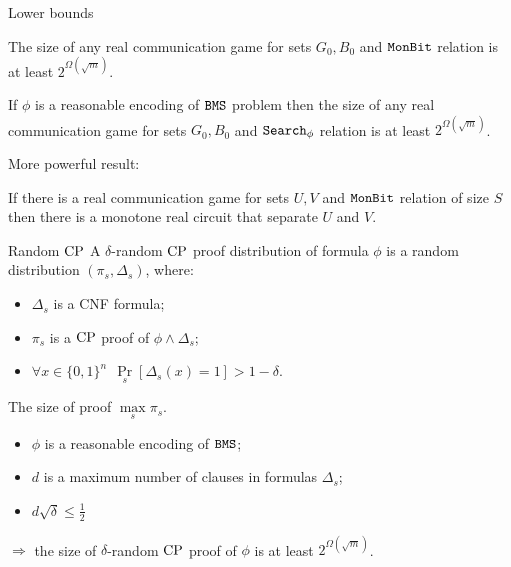 \begin{frame}{Lower bounds}


    \begin{theorem}[S 2016, unp.]
        The size of any real communication game for sets $G_0, B_0$ and $\mathtt{MonBit}$ relation is at least $2^{\Omega(\sqrt{m})}$.

        If $\phi$ is a reasonable encoding of $\mathtt{BMS}$ problem then the size of any real communication game for sets $G_0, B_0$
        and $\mathtt{Search}_{\phi}$ relation is at least $2^{\Omega(\sqrt{m})}$.
    \end{theorem}

    \pause
    More powerful result:
    \begin{theorem}
        If there is a real communication game for sets $U, V$ and $\mathtt{MonBit}$ relation of size $S$ then there is a monotone real
        circuit that separate $U$ and $V$.
    \end{theorem}
\end{frame}


\begin{frame}{Random $\mathrm{CP}$}
    A $\delta$-random $\mathrm{CP}$ proof distribution of formula $\phi$ is a random distribution $(\pi_s,
    \Delta_s)$, where:
    \begin{itemize}
        \item $\Delta_s$ is a CNF formula;
        \item $\pi_s$ is a $\mathrm{CP}$ proof of $\phi \land \Delta_s$;
        \item $\forall x \in \{0, 1\}^n ~~ \Pr\limits_s[\Delta_s(x) = 1] > 1 - \delta$.
    \end{itemize}

    The size of proof $\max\limits_s \pi_s$.
    \pause

    \begin{theorem}[S 2016, unp.]
        \begin{itemize}
            \item $\phi$ is a reasonable encoding of $\mathtt{BMS}$;
            \item $d$ is a maximum number of clauses in formulas $\Delta_s$;
            \item $d \sqrt{\delta} \le \frac{1}{2}$
        \end{itemize}
        $\Rightarrow$ the size of $\delta$-random $\mathrm{CP}$ proof of $\phi$ is at least $2^{\Omega(\sqrt{m})}$.
    \end{theorem}
\end{frame}



